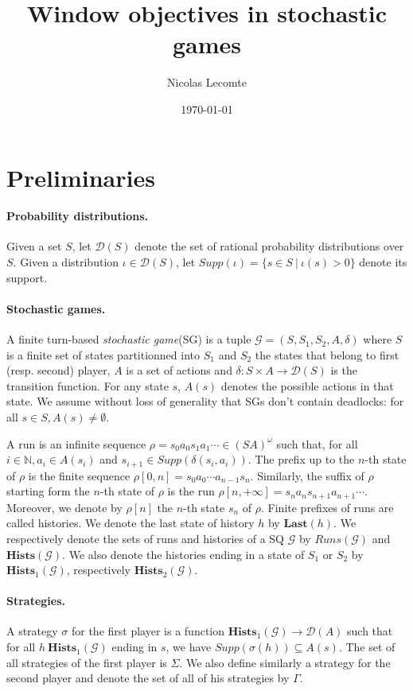 \documentclass{article}
\title{Window objectives in stochastic games}
\author{Nicolas Lecomte}
\date{\today}
\newcommand{\IN}{\mathbb{N}}
\newcommand{\CG}{\mathcal{G}}
\newcommand{\SG}{(S, S_1, S_2, A, \delta)}
\newcommand{\Hists}{\textbf{Hists}}
\newcommand{\Last}{\textbf{Last}}
\theoremstyle{plain}
\begin{document}
\maketitle

\section{Preliminaries}
\paragraph{Probability distributions.} Given a set $S$, let $\mathcal{D}(S)$ denote the set of rational probability distributions over $S$. Given a distribution $\iota \in \mathcal{D}(S)$, let $Supp(\iota) = \{s \in S ~|~ \iota(s) > 0\}$ denote its support.

\paragraph{Stochastic games.} A finite turn-based \textit{stochastic game}(SG) is a tuple $\mathcal{G} = \SG$ where $S$ is a finite set of states partitionned into $S_1$ and $S_2$ the states that belong to first (resp. second) player, $A$ is a set of actions and $\delta: S \times A \rightarrow \mathcal{D}(S)$ is the transition function. For any state $s$, $A(s)$ denotes the possible actions in that state.
We assume without loss of generality that SGs don't contain deadlocks: for all $s \in S, A(s) \neq \emptyset$.

A run is an infinite sequence $\rho = s_0 a_0 s_1 a_1 \cdots \in (SA)^{\omega}$ such that, for all $i \in \IN, a_i \in A(s_i)$ and $s_{i+1} \in Supp(\delta(s_i, a_i))$. The prefix up to the $n$-th state of $\rho$ is the finite sequence $\rho [0, n] = s_0 a_0 \cdots a_{n-1} s_n$. Similarly, the suffix of $\rho$ starting form the $n$-th state of $\rho$ is the run $\rho [n, + \infty] = s_n a_n s_{n+1} a_{n+1} \cdots$. Moreover, we denote by $\rho [n]$ the $n$-th state $s_n$ of $\rho$. Finite prefixes of runs are called histories. We denote the last state of history $h$ by $\Last(h)$. We respectively denote the sets of runs and histories of a SQ $\CG$ by $Runs(\CG)$ and $\Hists(\CG)$. We also denote the histories ending in a state of $S_1$ or $S_2$ by $\Hists_1(\CG)$, respectively $\Hists_2(\CG)$.

\paragraph{Strategies.} A strategy $\sigma$ for the first player is a function $\Hists_1(\CG) \rightarrow \mathcal{D}(A)$ such that  for all $h \ \Hists_1(\CG)$ ending in $s$, we have $Supp(\sigma(h)) \subseteq A(s)$. The set of all strategies of the first player is $\Sigma$. We also define similarly a strategy for the second player and denote the set of all of his strategies by $\Gamma$.
\end{document}
